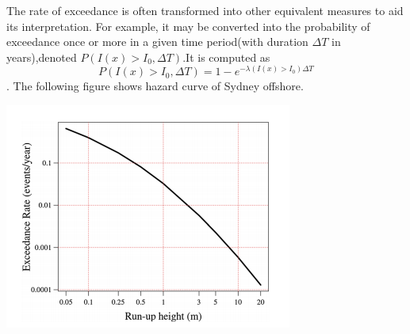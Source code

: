 \documentclass{article}
\begin{document}
\begin{itemize}
The rate of exceedance is often transformed into other equivalent measures to aid its interpretation. For example, it may be converted into the probability of exceedance once or more in a given time period(with duration $\Delta T$ in years),denoted $P(I(x)>I_{0},\Delta T)$.It is computed as 
$$P(I(x)>I_{0},\Delta T)=1-e^{-\lambda(I(x)>I_{0})\Delta T}$$. The following figure shows hazard curve of Sydney offshore.\\
\begin{center}
\includegraphics[]{exceedance.PNG}
\end{center}






\end{itemize}
\end{document}
